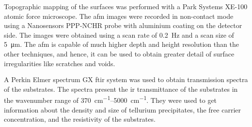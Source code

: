 Topographic mapping of the surfaces was performed with a Park Systems XE-100 atomic force microscope. The \ac{afm} images were recorded in non-contact mode using a Nanosensors PPP-NCHR probe with aluminium coating on the detector side. The images were obtained using a scan rate of \SI{0.2}{\hertz} and a scan size of \SI{5}{\micro\metre}. The \ac{afm} is capable of much higher depth and height resolution than the other techniques, and hence, it can be used to obtain greater detail of surface irregularities like scratches and voids.

A Perkin Elmer spectrum GX \ac{ftir} system was used to obtain transmission spectra of the substrates. The spectra present the \ac{ir} transmittance of the substrates in the wavenumber range of \SIrange{370}{5000}{\centi\metre^{-1}}. They were used to get information about the density and size of tellurium precipitates, the free carrier concentration, and the resistivity of the substrates. %

